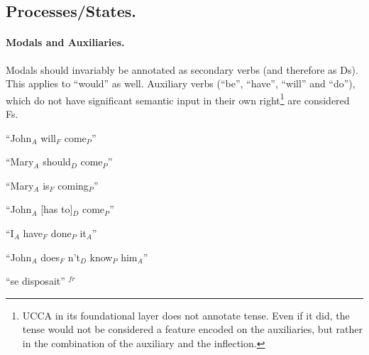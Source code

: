 \documentclass[11pt]{article}
\newcommand{\be}{\begin{enumerate}}
\newcommand{\ee}{\end{enumerate}}
\newcommand{\french}[1]{{\color{red}#1$^{fr}$}}
\newcommand{\dd}[1]{{\color{blue}{#1}}}
\newcommand{\oa}[1]{{\color{blue}{OA: #1}}}
\begin{document}
\subsection{Processes/States.}

\paragraph{Modals and Auxiliaries.} 
Modals should invariably be annotated as secondary verbs (and therefore as Ds). This applies to ``would'' as well. Auxiliary verbs (``be'', ``have'', ``will'' and ``do''), which do not have significant semantic input in their own right\footnote{UCCA in its foundational layer does not annotate tense. Even if it did, the tense would not be considered a feature encoded on the auxiliaries, but rather in the combination of the auxiliary and the inflection.} are considered Fs.

\be 
\item
``John$_A$ will$_F$ come$_P$''
\item
``Mary$_A$ should$_D$ come$_P$''
\item
``Mary$_A$ is$_F$ coming$_P$''
\item
``John$_A$ [has to]$_D$ come$_P$''
\item
``I$_A$ have$_F$ done$_P$ it$_A$''
\item
``John$_A$ does$_F$ n't$_D$ know$_P$ him$_A$''
\french{
\item
``se disposait''
}
\ee

\end{document}
